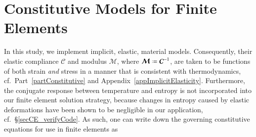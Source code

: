 \section{Constitutive Models for Finite Elements}


In this study, we implement implicit, elastic, material models.  Consequently, their elastic compliance $\boldsymbol{\mathcal{C}}$ and modulus $\boldsymbol{\mathcal{M}}$, where $\boldsymbol{\mathcal{M}} \defeq \boldsymbol{\mathcal{C}}^{-1}$, are taken to be functions of both strain \textit{and\/} stress in a manner that is consistent with thermo\-dynamics, cf.\ Part~\ref{partConstitutive} and Appendix~\ref{appImplicitElasticity}.  Furthermore, the conjugate response between temperature and entropy is not incorporated into our finite element solution strategy, because changes in entropy caused by elastic deformations have been shown to be negligible in our application, cf.\ \S\ref{secCE_verifyCode}.  As such, one can write down the governing constitutive equations for use in finite elements as
